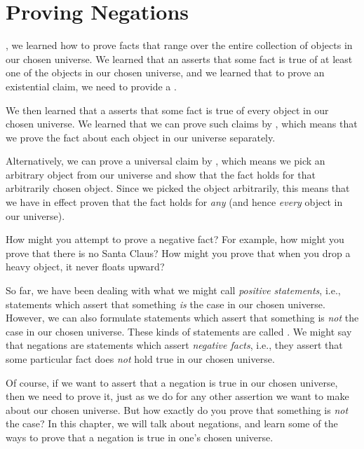 \documentclass[../../../main.tex]{subfiles}
\begin{document}
\chapter{Proving Negations}
\label{ch:proving-negations}

, we learned how to prove facts that range over the entire collection of objects in our chosen universe. We learned that an  asserts that some fact is true of at least one of the objects in our chosen universe, and we learned that to prove an existential claim, we need to provide a .

We then learned that a  asserts that some fact is true of every object in our chosen universe. We learned that we can prove such claims by , which means that we prove the fact about each object in our universe separately. 

Alternatively, we can prove a universal claim by , which means we pick an arbitrary object from our universe and show that the fact holds for that arbitrarily chosen object. Since we picked the object arbitrarily, this means that we have in effect proven that the fact holds for \emph{any} (and hence \emph{every} object in our universe).

\begin{ponder}
  How might you attempt to prove a negative fact? For example, how might you prove that there is no Santa Claus? How might you prove that when you drop a heavy object, it never floats upward?
\end{ponder}

So far, we have been dealing with what we might call \emph{positive statements}, i.e., statements which assert that something \emph{is} the case in our chosen universe. However, we can also formulate statements which assert that something is \emph{not} the case in our chosen universe. These kinds of statements are called . We might say that negations are statements which assert \emph{negative facts}, i.e., they assert that some particular fact does \emph{not} hold true in our chosen universe.

Of course, if we want to assert that a negation is true in our chosen universe, then we need to prove it, just as we do for any other assertion we want to make about our chosen universe. But how exactly do you prove that something is \emph{not} the case? In this chapter, we will talk about negations, and learn some of the ways to prove that a negation is true in one's chosen universe.
\end{document}
